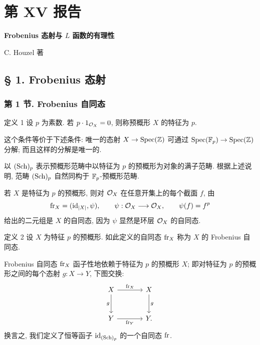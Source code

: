 \section*{第 XV 报告}
\begin{center}
\Large\bfseries Frobenius 态射与 $L$ 函数的有理性

\medskip
C. Houzel 著
\end{center}

\subsection*{§ 1. Frobenius 态射}

\subsubsection*{第 1 节. Frobenius 自同态}

\begin{statement}{定义 1}
设 $p$ 为素数. 若 $p\cdot 1_{\mathcal{O}_X}=0$, 则称预概形 $X$ 的特征为 $p$.
\end{statement}

这个条件等价于下述条件: 唯一的态射 $X\to\operatorname{Spec}(\mathbb Z)$ 可通过 $\operatorname{Spec}(\mathbb F_p)\to\operatorname{Spec}(\mathbb Z)$ 分解; 而且这样的分解是唯一的.

以 $(\operatorname{Sch})_p$ 表示预概形范畴中以特征为 $p$ 的预概形为对象的满子范畴. 根据上述说明, 范畴 $(\operatorname{Sch})_p$ 自然同构于 $\mathbb F_p$-预概形范畴.

若 $X$ 是特征为 $p$ 的预概形, 则对 $\mathcal{O}_X$ 在任意开集上的每个截面 $f$, 由
\[
\operatorname{fr}_X=(\operatorname{id}_{|X|},\psi),
\qquad \psi:\mathcal{O}_X\longrightarrow\mathcal{O}_X,
\qquad \psi(f)=f^p
\]
给出的二元组是 $X$ 的自同态, 因为 $\psi$ 显然是环层 $\mathcal{O}_X$ 的自同态.

\begin{statement}{定义 2}
设 $X$ 为特征 $p$ 的预概形. 如此定义的自同态 $\operatorname{fr}_X$ 称为 $X$ 的 Frobenius 自同态.
\end{statement}

Frobenius 自同态 $\operatorname{fr}_X$ 函子性地依赖于特征为 $p$ 的预概形 $X$; 即对特征为 $p$ 的预概形之间的每个态射 $g:X\to Y$, 下图交换:
\[
\begin{tikzcd}[column sep=large,row sep=large]
X \arrow[r,"\fr_X"] \arrow[d,"g"'] & X \arrow[d,"g"]\\
Y \arrow[r,"\fr_Y"'] & Y.
\end{tikzcd}
\]
换言之, 我们定义了恒等函子 $\operatorname{id}_{(\operatorname{Sch})_p}$ 的一个自同态 $\operatorname{fr}$.

